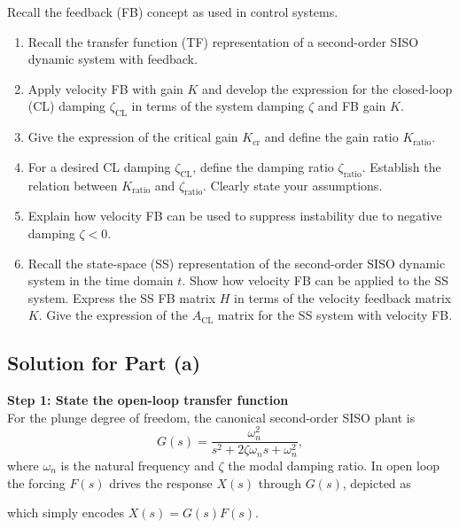 \documentclass[12pt]{article}
\begin{document}
Recall the feedback (FB) concept as used in control systems.
\begin{enumerate}[label=(\alph*)]
  \item Recall the transfer function (TF) representation of a second-order SISO dynamic system with feedback.
  \item Apply velocity FB with gain $K$ and develop the expression for the closed-loop (CL) damping $\zeta_{\text{CL}}$ in terms of the system damping $\zeta$ and FB gain $K$.
  \item Give the expression of the critical gain $K_{\text{cr}}$ and define the gain ratio $K_{\text{ratio}}$.
  \item For a desired CL damping $\zeta_{\text{CL}}$, define the damping ratio $\zeta_{\text{ratio}}$. Establish the relation between $K_{\text{ratio}}$ and $\zeta_{\text{ratio}}$. Clearly state your assumptions.
  \item Explain how velocity FB can be used to suppress instability due to negative damping $\zeta < 0$.
  \item Recall the state-space (SS) representation of the second-order SISO dynamic system in the time domain $t$. Show how velocity FB can be applied to the SS system. Express the SS FB matrix $H$ in terms of the velocity feedback matrix $K$. Give the expression of the $A_{\text{CL}}$ matrix for the SS system with velocity FB.
\end{enumerate}

\subsection*{Solution for Part (a)}

\begin{stepbox}
\textbf{Step 1: State the open-loop transfer function}\\[0.5em]
For the plunge degree of freedom, the canonical second-order SISO plant is
\[
G(s)=\frac{\omega_n^2}{s^2+2\zeta \omega_n s + \omega_n^2},
\]
where $\omega_n$ is the natural frequency and $\zeta$ the modal damping ratio. In open loop the forcing $F(s)$ drives the response $X(s)$ through $G(s)$, depicted as
\begin{center}
\end{center}
which simply encodes $X(s)=G(s)F(s)$.
\end{stepbox}
\end{document}
